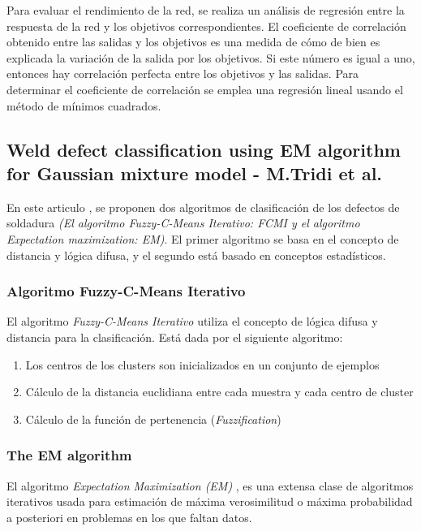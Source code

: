 Para evaluar el rendimiento de la red, se realiza un análisis de regresión entre la respuesta de la red y los objetivos correspondientes. El coeficiente de correlación obtenido entre las salidas y los objetivos es una medida de cómo de bien es explicada la variación de la salida por los objetivos. Si este número es igual a uno, entonces hay correlación perfecta entre los objetivos y las salidas. Para determinar el coeficiente de correlación se emplea una regresión lineal usando el método de mínimos cuadrados.


\subsection{Weld defect classification using EM algorithm for Gaussian mixture model - M.Tridi et al.}
En este articulo \cite{tridi}, se proponen dos algoritmos de clasificación de los defectos de soldadura  \textit{(El algoritmo Fuzzy-C-Means Iterativo: FCMI y el algoritmo Expectation maximization: EM)}.
El primer algoritmo se basa en el concepto de distancia y lógica difusa, y el segundo está basado en conceptos estadísticos. 


\subsubsection{Algoritmo Fuzzy-C-Means Iterativo} 
El algoritmo \textit{Fuzzy-C-Means Iterativo} \cite{kandel1999introduction} utiliza el concepto de lógica difusa y distancia para la clasificación. Está dada por el siguiente algoritmo:
	\begin{enumerate}
	\item Los centros de los clusters son inicializados en un conjunto de ejemplos
	\item Cálculo de la distancia euclidiana entre cada muestra y cada centro de cluster
	\item Cálculo de la función de pertenencia (\emph{Fuzzification}) 
	\end{enumerate}


\subsubsection{The EM algorithm}
El algoritmo \textit{Expectation Maximization (EM)} \cite{zhang2003algorithms}, es una extensa clase de algoritmos iterativos usada para estimación de máxima verosimilitud o máxima probabilidad a posteriori en problemas en los que faltan datos.


